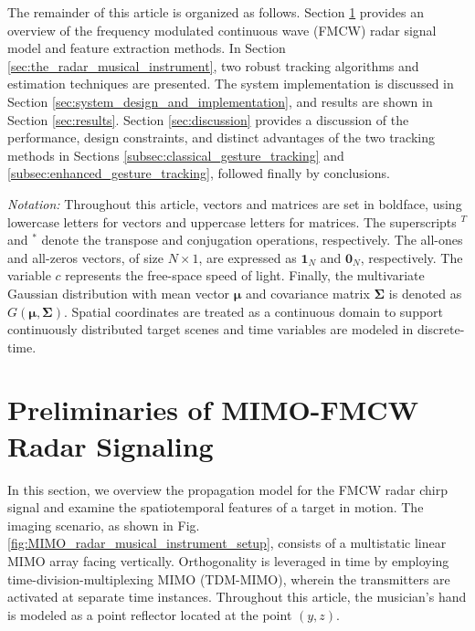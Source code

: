 \documentclass[10pt,journal,final]{IEEEtran}
\begin{document}
The remainder of this article is organized as follows. 
Section \ref{sec:radar_theory_for_musicians} provides an overview of the frequency modulated continuous wave (FMCW) radar signal model and feature extraction methods. 
In Section \ref{sec:the_radar_musical_instrument}, two robust tracking algorithms and estimation techniques are presented.
The system implementation is discussed in Section \ref{sec:system_design_and_implementation}, and results are shown in Section \ref{sec:results}. 
Section \ref{sec:discussion} provides a discussion of the performance, design constraints, and distinct advantages of the two tracking methods in Sections \ref{subsec:classical_gesture_tracking} and \ref{subsec:enhanced_gesture_tracking}, followed finally by conclusions.

\textit{Notation:} Throughout this article, vectors and matrices are set in boldface, using lowercase letters for vectors and uppercase letters for matrices. 
The superscripts $^T$ and $^*$ denote the transpose and conjugation operations, respectively. 
The all-ones and all-zeros vectors, of size $N \times 1$, are expressed as $\mathbf{1}_N$ and $\mathbf{0}_N$, respectively. 
The variable $c$ represents the free-space speed of light.
Finally, the multivariate Gaussian distribution with mean vector $\mathbf{\mu}$ and covariance matrix $\mathbf{\Sigma}$ is denoted as $G(\mathbf{\mu},\mathbf{\Sigma})$.
Spatial coordinates are treated as a continuous domain to support continuously distributed target scenes and time variables are modeled in discrete-time.

\section{Preliminaries of MIMO-FMCW Radar Signaling}
\label{sec:radar_theory_for_musicians}
In this section, we overview the propagation model for the FMCW radar chirp signal and examine the spatiotemporal features of a target in motion. 
The imaging scenario, as shown in Fig. \ref{fig:MIMO_radar_musical_instrument_setup}, consists of a multistatic linear MIMO array facing vertically. 
Orthogonality is leveraged in time by employing time-division-multiplexing MIMO (TDM-MIMO), wherein the transmitters are activated at separate time instances.
Throughout this article, the musician's hand is modeled as a point reflector located at the point $(y,z)$.
\end{document}
